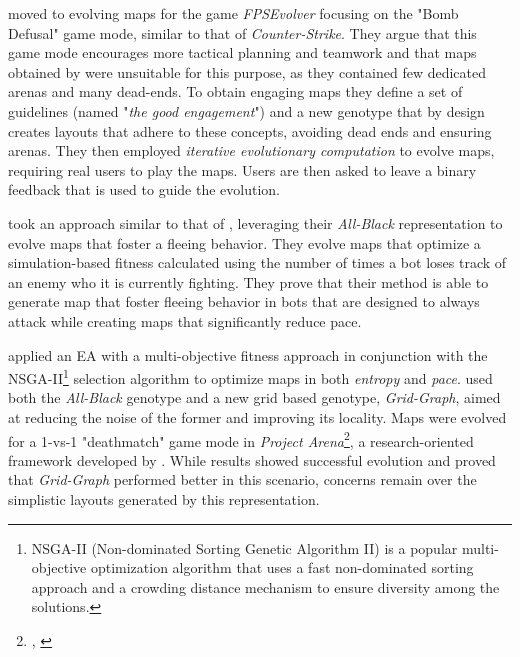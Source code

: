 \documentclass{Configuration_Files/PoliMi3i_thesis}
\begin{document}
 moved to evolving maps for the game \textit{FPSEvolver} focusing on the "Bomb Defusal" game mode, similar to that of \textit{Counter-Strike}. They argue that this game mode encourages more tactical planning and teamwork and that maps obtained by  were unsuitable for this purpose, as they contained few dedicated arenas and many dead-ends. To obtain engaging maps they define a set of guidelines (named "\textit{the good engagement}") and a new genotype that by design creates layouts that adhere to these concepts, avoiding dead ends and ensuring arenas. They then employed \textit{iterative evolutionary computation} to evolve maps, requiring real users to play the maps. Users are then asked to leave a binary feedback that is used to guide the evolution. \cite{olsted_interactive_2015}

 took an approach similar to that of , leveraging their \textit{All-Black} representation to evolve maps that foster a fleeing behavior. They evolve maps that optimize a simulation-based fitness calculated using the number of times a bot loses track of an enemy who it is currently fighting. They prove that their method is able to generate map that foster fleeing behavior in bots that are designed to always attack while creating maps that significantly reduce pace. \cite{loiacono_fight_2017}

\citeauthor{bari_evolutionary-based_2023} applied an EA with a multi-objective fitness approach in conjunction with the NSGA-II\footnote{NSGA-II (Non-dominated Sorting Genetic Algorithm II) is a popular multi-objective optimization algorithm that uses a fast non-dominated sorting approach and a crowding distance mechanism to ensure diversity among the solutions.} selection algorithm to optimize maps in both \textit{entropy} and \textit{pace}.  used both the \textit{All-Black} genotype and a new grid based genotype, \textit{Grid-Graph}, aimed at reducing the noise of the former and improving its locality. Maps were evolved for a 1-vs-1 "deathmatch" game mode in \textit{Project Arena}\footnote{, \citeyear{ballabio_online_2018}}, a research-oriented framework developed by . While results showed successful evolution and proved that \textit{Grid-Graph} performed better in this scenario, concerns remain over the simplistic layouts generated by this representation. \cite{bari_evolutionary-based_2023}
\end{document}
